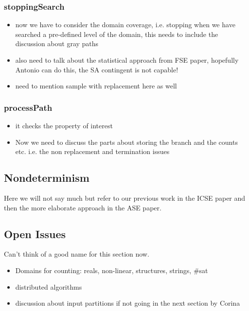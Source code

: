 \subsubsection{stoppingSearch}

\begin{itemize}
\item now we have to consider the domain coverage, i.e. stopping when we have searched a pre-defined level of the domain, this needs to include the discussion about gray paths
\item also need to talk about the statistical approach from FSE paper, hopefully Antonio can do this, the SA contingent is not capable!
\item need to mention sample with replacement here as well
\end{itemize}

\subsubsection{processPath}
\begin{itemize}
\item it checks the property of interest
\item Now we need to discuss the parts about storing the branch and the counts etc. i.e. the non replacement and termination issues
\end{itemize}

\subsection{Nondeterminism}

Here we will not say much but refer to our previous work in the ICSE paper and then the more elaborate approach in the ASE paper.

\subsection{Open Issues}

Can't think of a good name for this section now.

\begin{itemize}
\item Domains for counting: reals, non-linear, structures, strings, \#sat
\item distributed algorithms
\item discussion about input partitions if not going in the next section by Corina
\end{itemize}

